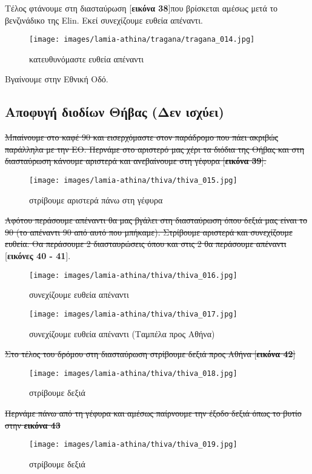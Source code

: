 Τέλος φτάνουμε στη διασταύρωση [\textbf{εικόνα 38}]που βρίσκεται αμέσως μετά το βενζινάδικο της Elin. Εκεί συνεχίζουμε ευθεία απέναντι.
\begin{figure}[H]
\texttt{[image: images/lamia-athina/tragana/tragana\_014.jpg]} 
\caption{κατευθυνόμαστε ευθεία απέναντι}
\end{figure}
Βγαίνουμε στην Εθνική Οδό.
\newpage
\begin{center}
\section*{Αποφυγή διοδίων Θήβας (Δεν ισχύει)}
\end{center}
\sout{Μπαίνουμε στο καφέ 90 και εισερχόμαστε στον παράδρομο που πάει ακριβώς παράλληλα με την ΕΟ. Περνάμε στο αριστερό μας χέρι τα διόδια της Θήβας και στη διασταύρωση κάνουμε αριστερά και ανεβαίνουμε στη γέφυρα [\textbf{εικόνα 39}]. }
\begin{figure}[H]
\texttt{[image: images/lamia-athina/thiva/thiva\_015.jpg]} 
\caption{στρίβουμε αριστερά πάνω στη γέφυρα}
\end{figure}
\sout{Αφότου περάσουμε απέναντι θα μας βγάλει στη διασταύρωση όπου δεξιά μας είναι το 90 (το απέναντι 90 από αυτό που μπήκαμε). Στρίβουμε αριστερά και συνεχίζουμε ευθεία. Θα περάσουμε 2 διασταυρώσεις όπου και στις 2 θα περάσουμε απέναντι} [\textbf{εικόνες 40 - 41}].
\begin{figure}[H]
\texttt{[image: images/lamia-athina/thiva/thiva\_016.jpg]} 
\caption{συνεχίζουμε ευθεία απέναντι}
\end{figure}
\begin{figure}[H]
\texttt{[image: images/lamia-athina/thiva/thiva\_017.jpg]} 
\caption{συνεχίζουμε ευθεία απέναντι (Ταμπέλα προς Αθήνα)}
\end{figure}
\sout{Στο τέλος του δρόμου στη διασταύρωση στρίβουμε δεξιά προς Αθήνα [\textbf{εικόνα 42}]}
\begin{figure}[H]
\texttt{[image: images/lamia-athina/thiva/thiva\_018.jpg]} 
\caption{στρίβουμε δεξιά}
\end{figure}
\sout{Περνάμε πάνω από τη γέφυρα και αμέσως παίρνουμε την έξοδο δεξιά όπως το βυτίο στην \textbf{εικόνα 43}}
\begin{figure}[H]
\texttt{[image: images/lamia-athina/thiva/thiva\_019.jpg]} 
\caption{στρίβουμε δεξιά}
\end{figure}
